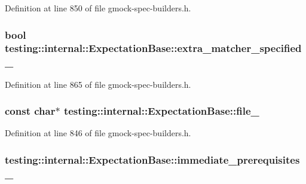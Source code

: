 Definition at line 850 of file gmock-\/spec-\/builders.\+h.

\subsubsection[{\texorpdfstring{extra\+\_\+matcher\+\_\+specified\+\_\+}{extra_matcher_specified_}}]{\setlength{\rightskip}{0pt plus 5cm}bool testing\+::internal\+::\+Expectation\+Base\+::extra\+\_\+matcher\+\_\+specified\+\_\+\hspace{0.3cm}{\ttfamily [protected]}}\hypertarget{classtesting_1_1internal_1_1_expectation_base_a34f599ac7ae4f1fb7567e0d4c9fadcba}{}\label{classtesting_1_1internal_1_1_expectation_base_a34f599ac7ae4f1fb7567e0d4c9fadcba}


Definition at line 865 of file gmock-\/spec-\/builders.\+h.

\subsubsection[{\texorpdfstring{file\+\_\+}{file_}}]{\setlength{\rightskip}{0pt plus 5cm}const char$\ast$ testing\+::internal\+::\+Expectation\+Base\+::file\+\_\+\hspace{0.3cm}{\ttfamily [protected]}}\hypertarget{classtesting_1_1internal_1_1_expectation_base_afabf690537298bbb84e9b443f62d7e97}{}\label{classtesting_1_1internal_1_1_expectation_base_afabf690537298bbb84e9b443f62d7e97}


Definition at line 846 of file gmock-\/spec-\/builders.\+h.

\subsubsection[{\texorpdfstring{immediate\+\_\+prerequisites\+\_\+}{immediate_prerequisites_}}]{ testing\+::internal\+::\+Expectation\+Base\+::immediate\+\_\+prerequisites\+\_\+\hspace{0.3cm}{\ttfamily [protected]}}\hypertarget{classtesting_1_1internal_1_1_expectation_base_a186eff0fdcacc8c1e1a2becdec11d3cd}{}\label{classtesting_1_1internal_1_1_expectation_base_a186eff0fdcacc8c1e1a2becdec11d3cd}


